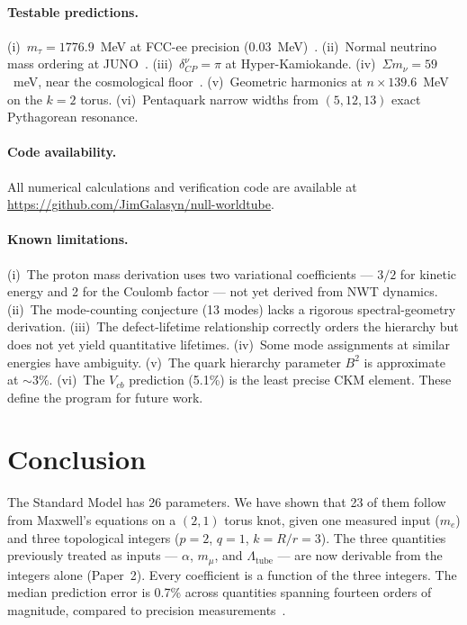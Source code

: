 \documentclass[11pt,a4paper]{article}
\begin{document}
\paragraph{Testable predictions.}
(i)~$m_\tau = 1776.9$~MeV at FCC-ee precision (0.03~MeV)~\cite{fcc2019}. (ii)~Normal neutrino mass ordering at JUNO~\cite{juno2016}. (iii)~$\delta_{CP}^\nu = \pi$ at Hyper-Kamiokande. (iv)~$\Sigma m_\nu = 59$~meV, near the cosmological floor~\cite{desi2024}. (v)~Geometric harmonics at $n \times 139.6$~MeV on the $k=2$ torus. (vi)~Pentaquark narrow widths from $(5,12,13)$ exact Pythagorean resonance.

\paragraph{Code availability.}
All numerical calculations and verification code are available at \url{https://github.com/JimGalasyn/null-worldtube}.

\paragraph{Known limitations.}
(i)~The proton mass derivation uses two variational coefficients --- $3/2$ for kinetic energy and 2 for the Coulomb factor --- not yet derived from NWT dynamics. (ii)~The mode-counting conjecture (13 modes) lacks a rigorous spectral-geometry derivation. (iii)~The defect-lifetime relationship correctly orders the hierarchy but does not yet yield quantitative lifetimes. (iv)~Some mode assignments at similar energies have ambiguity. (v)~The quark hierarchy parameter $B^2$ is approximate at ${\sim}3\%$. (vi)~The $V_{cb}$ prediction (5.1\%) is the least precise CKM element. These define the program for future work.

\section{Conclusion}
\label{sec:conclusion}

The Standard Model has 26 parameters. We have shown that 23 of them follow from Maxwell's equations on a $(2,1)$ torus knot, given one measured input ($m_e$) and three topological integers ($p=2$, $q=1$, $k=R/r=3$). The three quantities previously treated as inputs --- $\alpha$, $m_\mu$, and $\Lambda_{\text{tube}}$ --- are now derivable from the integers alone (Paper~2). Every coefficient is a function of the three integers. The median prediction error is 0.7\% across quantities spanning fourteen orders of magnitude, compared to precision measurements~\cite{parker2018,pdg2022}.
\end{document}

